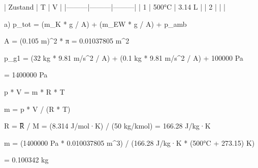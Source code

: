 | Zustand | T       | V       |  
|---------|---------|---------|  
| 1       | 500°C   | 3.14 L  |  
| 2       |         |         |  

a)  
p_tot = (m_K * g / A) + (m_EW * g / A) + p_amb  

A = (0.105 m)^2 * π = 0.01037805 m^2  

p_g1 = (32 kg * 9.81 m/s^2 / A) + (0.1 kg * 9.81 m/s^2 / A) + 100000 Pa  

= 1400000 Pa  

p * V = m * R * T  

m = p * V / (R * T)  

R = R̅ / M = (8.314 J/mol·K) / (50 kg/kmol) = 166.28 J/kg·K  

m = (1400000 Pa * 0.010037805 m^3) / (166.28 J/kg·K * (500°C + 273.15) K)  

= 0.100342 kg